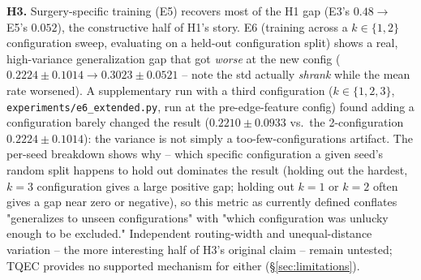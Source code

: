 \documentclass[11pt]{article}
\begin{document}
\textbf{H3.} Surgery-specific training (E5) recovers most of the H1 gap
(E3's $0.48 \to$ E5's $0.052$), the constructive half of H1's story. E6
(training across a $k \in \{1,2\}$ configuration sweep, evaluating on a
held-out configuration split) shows a real, high-variance generalization
gap that got \emph{worse} at the new config ($0.2224 \pm 0.1014 \to
0.3023 \pm 0.0521$ -- note the std actually \emph{shrank} while the mean
rate worsened). A supplementary run with a third configuration
($k \in \{1,2,3\}$, \texttt{experiments/e6\_extended.py}, run at the
pre-edge-feature config) found adding a configuration barely changed the
result ($0.2210 \pm 0.0933$ vs.\ the 2-configuration $0.2224 \pm 0.1014$):
the variance is not simply a
too-few-configurations artifact. The per-seed breakdown shows why -- which
specific configuration a given seed's random split happens to hold out
dominates the result (holding out the hardest, $k=3$ configuration gives a
large positive gap; holding out $k=1$ or $k=2$ often gives a gap near zero
or negative), so this metric as currently defined conflates "generalizes
to unseen configurations" with "which configuration was unlucky enough to
be excluded." Independent routing-width and unequal-distance variation --
the more interesting half of H3's original claim -- remain untested; TQEC
provides no supported mechanism for either (\S\ref{sec:limitations}).
\end{document}

